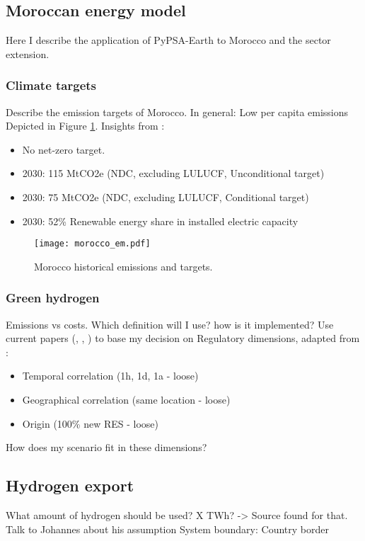 
\subsection{Moroccan energy model}
Here I describe the application of PyPSA-Earth \cite{Parzen2022} to Morocco and the sector extension.
\subsubsection{Climate targets}
Describe the emission targets of Morocco. In general: Low per capita emissions
Depicted in Figure \ref{fig:morocco_em}.
Insights from \cite{CAT2021}:
\begin{itemize}
    \item No net-zero target.
    \item 2030: 115 MtCO2e (NDC, excluding LULUCF, Unconditional target)
    \item 2030: 75 MtCO2e (NDC, excluding LULUCF, Conditional target)
    \item 2030: 52\% Renewable energy share in installed electric capacity
\end{itemize}



\begin{figure}[h!]
    \centering
    \texttt{[image: morocco\_em.pdf]}
    \caption{Morocco historical emissions and targets.}
    \label{fig:morocco_em}
\end{figure}




\subsubsection{Green hydrogen}
Emissions vs costs. Which definition will I use? how is it implemented?
Use current papers (\cite{Brauer2022}, \cite{Ruhnau2022}, \cite{Zeyen2022a}) to base my decision on
Regulatory dimensions, adapted from \cite{Brauer2022}:
\begin{itemize}
    \item Temporal correlation (1h, 1d, 1a - loose) 
    \item Geographical correlation (same location - loose)
    \item Origin (100\% new RES - loose)
\end{itemize}
How does my scenario fit in these dimensions?
\subsection{Hydrogen export}
What amount of hydrogen should be used? X TWh? -> Source found for that. Talk to Johannes about his assumption
System boundary: Country border
